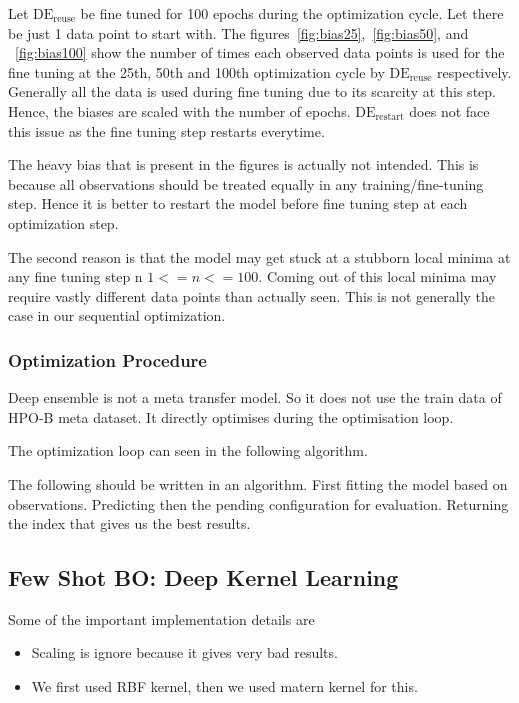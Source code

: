 \documentclass[11pt]{report}
\begin{document}
Let $\textrm{DE}_{\textrm{reuse}}$ be fine tuned for 100 epochs during the optimization cycle.
Let there be just 1 data point to start with.
The figures~\ref{fig:bias25},~\ref{fig:bias50},  and ~\ref{fig:bias100} show the number of times each observed data points is used for the fine tuning at the 25th, 50th and 100th optimization cycle by $\textrm{DE}_{\textrm{reuse}}$  respectively.
Generally all the data is used during fine tuning due to its scarcity at this step.
Hence, the biases are scaled with the number of epochs.
$\textrm{DE}_{\textrm{restart}}$ does not face this issue as the fine tuning step restarts everytime.

The heavy bias that is present in the figures is actually not intended.
This is because all observations should be treated equally in any training/fine-tuning step.
Hence it is better to restart the model before fine tuning step at each optimization step.

The second reason is that the model may get stuck at a stubborn local minima at any fine tuning step n $1 <= n <= 100$.
Coming out of this local minima may require vastly different data points than actually seen.
This is not generally the case in our sequential optimization.

\subsubsection{Optimization Procedure}
Deep ensemble is not a meta transfer model.
So it does not use the train data of HPO-B meta dataset.
It directly optimises during the optimisation loop.

The optimization loop can seen in the following algorithm.

The following should be written in an algorithm.
First fitting the model based on observations.
Predicting then the pending configuration for evaluation.
Returning the index that gives us the best results.

\subsection{Few Shot BO: Deep Kernel Learning}

Some of the important implementation details are
\begin{itemize}
\item Scaling is ignore because it gives very bad results.
\item We first used RBF kernel,  then we used matern kernel for this.
\end{itemize}
\end{document}
